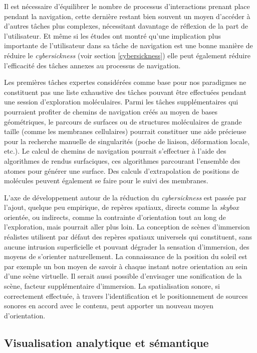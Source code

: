 Il est nécessaire d'équilibrer le nombre de processus d'interactions prenant place pendant la navigation, cette dernière restant bien souvent un moyen d'accéder à d'autres tâches plus complexes, nécessitant davantage de réflexion de la part de l'utilisateur. Et même si les études ont montré qu'une implication plus importante de l'utilisateur dans sa tâche de navigation est une bonne manière de réduire le \textit{cybersickness} (voir section \ref{cybersickness}) elle peut également réduire l'efficacité des tâches annexes au processus de navigation.

Les premières tâches expertes considérées comme base pour nos paradigmes ne constituent pas une liste exhaustive des tâches pouvant être effectuées pendant une session d'exploration moléculaires. Parmi les tâches supplémentaires qui pourraient profiter de chemins de navigation créés au moyen de bases géométriques, le parcours de surfaces ou de structures moléculaires de grande taille (comme les membranes cellulaires) pourrait constituer une aide précieuse pour la recherche manuelle de singularités (poche de liaison, déformation locale, etc.). Le calcul de chemins de navigation pourrait s'effectuer à l'aide des algorithmes de rendus surfaciques, ces algorithmes parcourant l'ensemble des atomes pour générer une surface. Des calculs d'extrapolation de positions de molécules peuvent également se faire pour le suivi des membranes.

L'axe de développement autour de la réduction du \textit{cybersickness} est passée par l'ajout, quelque peu empirique, de repères spatiaux, directs comme la \textit{skybox} orientée, ou indirects, comme la contrainte d'orientation tout au long de l'exploration, mais pourrait aller plus loin. La conception de scènes d'immersion réalistes utilisent par défaut des repères spatiaux universels qui constituent, sans aucune intrusion superficielle et pouvant dégrader la sensation d'immersion, des moyens de s'orienter naturellement. La connaissance de la position du soleil est par exemple un bon moyen de savoir à chaque instant notre orientation au sein d'une scène virtuelle.
Il serait aussi possible d'envisager une sonification de la scène, facteur supplémentaire d'immersion. La spatialisation sonore, si correctement effectuée, à travers l'identification et le positionnement de sources sonores en accord avec le contenu, peut apporter un nouveau moyen d'orientation.
 

\subsection*{Visualisation analytique et sémantique}

